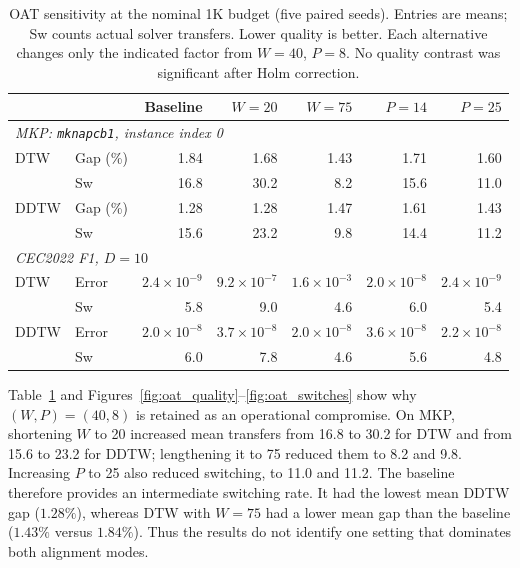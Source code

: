\documentclass[review]{elsarticle}
\begin{document}
\begin{table}[htbp]
\centering
\small
\setlength{\tabcolsep}{4pt}
\caption{OAT sensitivity at the nominal 1K budget (five paired seeds).
Entries are means; Sw counts actual solver transfers. Lower quality is
better. Each alternative changes only the indicated factor from
$W=40$, $P=8$. No quality contrast was significant after Holm correction.}
\label{tab:param_justification}
\begin{tabular}{llrrrrr}
\toprule
& & \textbf{Baseline} & \textbf{$W=20$} & \textbf{$W=75$} & \textbf{$P=14$} & \textbf{$P=25$} \\
\midrule
\multicolumn{7}{l}{\textit{MKP: \texttt{mknapcb1}, instance index 0}} \\
DTW  & Gap (\%) & 1.84 & 1.68 & 1.43 & 1.71 & 1.60 \\
     & Sw       & 16.8 & 30.2 & 8.2 & 15.6 & 11.0 \\
DDTW & Gap (\%) & 1.28 & 1.28 & 1.47 & 1.61 & 1.43 \\
     & Sw       & 15.6 & 23.2 & 9.8 & 14.4 & 11.2 \\
\midrule
\multicolumn{7}{l}{\textit{CEC2022 F1, $D=10$}} \\
DTW  & Error & $2.4{\times}10^{-9}$ & $9.2{\times}10^{-7}$ & $1.6{\times}10^{-3}$ & $2.0{\times}10^{-8}$ & $2.4{\times}10^{-9}$ \\
     & Sw    & 5.8 & 9.0 & 4.6 & 6.0 & 5.4 \\
DDTW & Error & $2.0{\times}10^{-8}$ & $3.7{\times}10^{-8}$ & $2.0{\times}10^{-8}$ & $3.6{\times}10^{-8}$ & $2.2{\times}10^{-8}$ \\
     & Sw    & 6.0 & 7.8 & 4.6 & 5.6 & 4.8 \\
\bottomrule
\end{tabular}
\end{table}

Table~\ref{tab:param_justification} and
Figures~\ref{fig:oat_quality}--\ref{fig:oat_switches} show why
$(W,P)=(40,8)$ is retained as an operational compromise.
On MKP, shortening $W$ to 20 increased mean transfers from 16.8 to 30.2
for DTW and from 15.6 to 23.2 for DDTW; lengthening it to 75 reduced
them to 8.2 and 9.8. Increasing $P$ to 25 also reduced switching,
to 11.0 and 11.2. The baseline therefore provides an intermediate
switching rate. It had the lowest mean DDTW gap ($1.28\%$), whereas
DTW with $W=75$ had a lower mean gap than the baseline
($1.43\%$ versus $1.84\%$). Thus the results do not identify one setting
that dominates both alignment modes.
\end{document}
